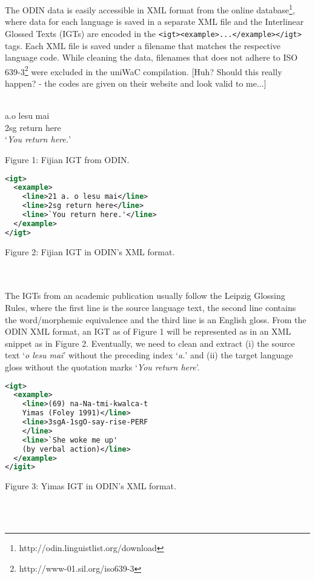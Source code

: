 The ODIN data is easily accessible in XML format from the online database\footnote{http://odin.linguistlist.org/download}, where data for each language is saved in a separate XML file and the Interlinear Glossed Texts (IGTs) are encoded in the \texttt{<igt><example>...</example></igt>} tags. Each XML file is saved under a filename that matches the respective language code. While cleaning the data, filenames that does not adhere to ISO 639-3\footnote{http://www-01.sil.org/iso639-3} were excluded in the uniWaC compilation. [Huh? Should this really happen? - the codes are given on their website and look valid to me...]
\\ \\
\begin{minipage}{\columnwidth}

 a.\quad o lesu mai \\
\indent \qquad\qquad 2sg return here \\
\indent \qquad\qquad `\emph{You return here.}' \\
\centerline{Figure 1: Fijian IGT from ODIN.}
\end{minipage}


\begin{minipage}{\columnwidth}
\begin{lstlisting}[language=XML]
<igt>
  <example>
    <line>21 a. o lesu mai</line>
    <line>2sg return here</line>
    <line>`You return here.'</line>
  </example>
</igt>
\end{lstlisting} 
\centerline{Figure 2: Fijian IGT in ODIN's XML format.}
\end{minipage}
\\ \\
\noindent The IGTs from an academic publication usually follow the Leipzig Glossing Rules, where the first line is the source language text, the second line contains the word/morphemic equivalence and the third line is an English gloss. From the ODIN XML format, an IGT as of Figure 1 will be represented as in an XML snippet as in Figure 2. Eventually, we need to clean and extract (i) the source text `\emph{o lesu mai}' without the preceding index `\emph{a.}' and (ii) the target language gloss without the quotation marks `\emph{You return here}'.
\begin{minipage}{\columnwidth}
\begin{lstlisting}[language=XML]
<igt>
  <example>
    <line>(69) na-Na-tmi-kwalca-t 
    Yimas (Foley 1991)</line>
    <line>3sgA-1sgO-say-rise-PERF
    </line>
    <line>`She woke me up' 
    (by verbal action)</line>
  </example>
</igit>
\end{lstlisting} 
\smallskip
\centerline{Figure 3: Yimas IGT in ODIN's XML format.}
\end{minipage}
\\ \\

